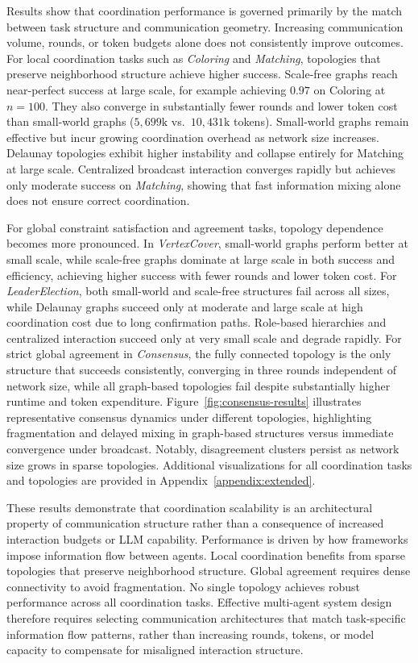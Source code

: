 Results show that coordination performance is governed primarily by the match between task structure and communication geometry. Increasing communication volume, rounds, or token budgets alone does not consistently improve outcomes. For local coordination tasks such as \emph{Coloring} and \emph{Matching}, topologies that preserve neighborhood structure achieve higher success. Scale-free graphs reach near-perfect success at large scale, for example achieving \(0.97\) on Coloring at \(n=100\). They also converge in substantially fewer rounds and lower token cost than small-world graphs (\(5{,}699\text{k}\) vs.\ \(10{,}431\text{k}\) tokens). Small-world graphs remain effective but incur growing coordination overhead as network size increases. Delaunay topologies exhibit higher instability and collapse entirely for Matching at large scale. Centralized broadcast interaction converges rapidly but achieves only moderate success on \emph{Matching}, showing that fast information mixing alone does not ensure correct coordination.



For global constraint satisfaction and agreement tasks, topology dependence becomes more pronounced. In \emph{VertexCover}, small-world graphs perform better at small scale, while scale-free graphs dominate at large scale in both success and efficiency, achieving higher success with fewer rounds and lower token cost. For \emph{LeaderElection}, both small-world and scale-free structures fail across all sizes, while Delaunay graphs succeed only at moderate and large scale at high coordination cost due to long confirmation paths. Role-based hierarchies and centralized interaction succeed only at very small scale and degrade rapidly. For strict global agreement in \emph{Consensus}, the fully connected topology is the only structure that succeeds consistently, converging in three rounds independent of network size, while all graph-based topologies fail despite substantially higher runtime and token expenditure. Figure~\ref{fig:consensus-results} illustrates representative consensus dynamics under different topologies, highlighting fragmentation and delayed mixing in graph-based structures versus immediate convergence under broadcast. Notably, disagreement clusters persist as network size grows in sparse topologies. Additional visualizations for all coordination tasks and topologies are provided in Appendix~\ref{appendix:extended}.

These results demonstrate that coordination scalability is an architectural property of communication structure rather than a consequence of increased interaction budgets or LLM capability. Performance is driven by how frameworks impose information flow between agents. Local coordination benefits from sparse topologies that preserve neighborhood structure. Global agreement requires dense connectivity to avoid fragmentation. No single topology achieves robust performance across all coordination tasks. Effective multi-agent system design therefore requires selecting communication architectures that match task-specific information flow patterns, rather than increasing rounds, tokens, or model capacity to compensate for misaligned interaction structure.



